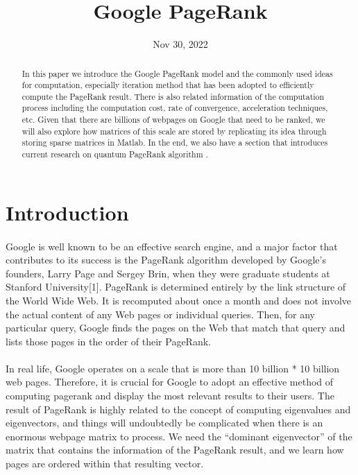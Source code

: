 \documentclass[12pt]{article}
\title{Google PageRank}
\date{Nov 30, 2022}
\begin{document}
\maketitle

\begin{abstract} 
\noindent In this paper we introduce the Google PageRank model and the commonly used ideas for computation, especially iteration method that has been adopted to efficiently compute the PageRank result. There is also related information of the computation process including the computation cost, rate of convergence, acceleration techniques, etc. Given that there are billions of webpages on Google that need to be ranked, we will also explore how matrices of this scale are stored by replicating its idea through storing sparse matrices in Matlab. In the end, we also have a section that introduces current research on quantum PageRank algorithm .  \end{abstract}

\tableofcontents
\section{Introduction}

\paragraph{} Google is well known to be an effective search engine, and a major factor that contributes to its success is the PageRank algorithm developed by Google’s founders, Larry Page and Sergey Brin, when they were graduate students at Stanford University[1]. PageRank is determined entirely by the link structure of the World Wide Web. It is recomputed about once a month and does not involve the actual content of any Web pages or individual queries. Then, for any particular query, Google finds the pages on the Web that match that query and lists those pages in the order of their PageRank.

\paragraph{} In real life, Google operates on a scale that is more than 10 billion * 10 billion web pages. Therefore, it is crucial for Google to adopt an effective method of computing pagerank and display the most relevant results to their users. The result of PageRank is highly related to the concept of computing eigenvalues and eigenvectors, and things will undoubtedly be complicated when there is an enormous webpage matrix to process. We need the “dominant eigenvector” of the matrix that contains the information of the PageRank result, and we learn how pages are ordered within that resulting vector.
\end{document}
